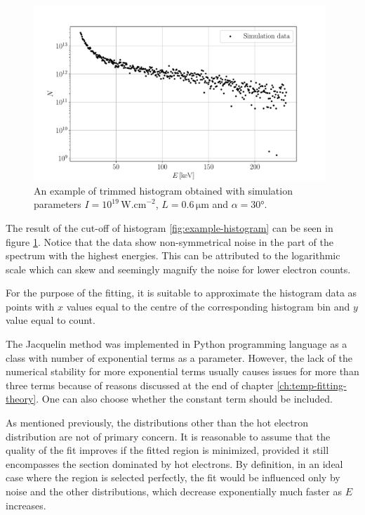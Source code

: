 \begin{figure}[h]
	\centering
	\includegraphics[width=0.98\textwidth]{figures/trimmed-hist}
	\caption{An example of trimmed histogram obtained with simulation parameters $I=10^{19}\,\mathrm{W.cm}^{-2}$, $L=0.6\,\mathrm{\mu m}$ and $\alpha = 30$°.}
	\label{fig:trimmed-hist}
\end{figure}

The result of the cut-off of histogram \ref{fig:example-histogram} can be seen in figure \ref{fig:trimmed-hist}. Notice that the data show non-symmetrical noise in the part of the spectrum with the highest energies. This can be attributed to the logarithmic scale which can skew and seemingly magnify the noise for lower electron counts. 

For the purpose of the fitting, it is suitable to approximate the histogram data as points with $x$ values equal to the centre of the corresponding histogram bin and $y$ value equal to count.

The Jacquelin method was implemented in Python programming language as a class with number of exponential terms as a parameter. However, the lack of the numerical stability for more exponential terms usually causes issues for more than three terms because of reasons discussed at the end of chapter \ref{ch:temp-fitting-theory}. One can also choose whether the constant term should be included.

As mentioned previously, the distributions other than the hot electron distribution are not of primary concern. It is reasonable to assume that the quality of the fit improves if the fitted region is minimized, provided it still encompasses the section dominated by hot electrons. By definition, in an ideal case where the region is selected perfectly, the fit would be influenced only by noise and the other distributions, which decrease exponentially much faster as $E$ increases.

